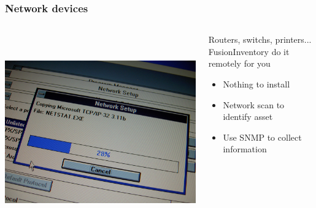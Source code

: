 \documentclass{beamer}
\begin{document}
\begin{frame}

    \frametitle{Network devices}


 \begin{columns}
 \begin{column}{0.15\textwidth}
         \includegraphics[height=8.5cm]{./pics/networking.jpg}
 \end{column}
 \begin{column}{1.25\textwidth}
    

    \begin{block}{Routers, switchs, printers... \\
    FusionInventory do it remotely for you}
        \begin{itemize}
            \item Nothing to install
            \item Network scan to identify asset
            \item Use SNMP to collect information
        \end{itemize}
    \end{block}

 \end{column}
\end{columns}
\end{frame}
\end{document}
